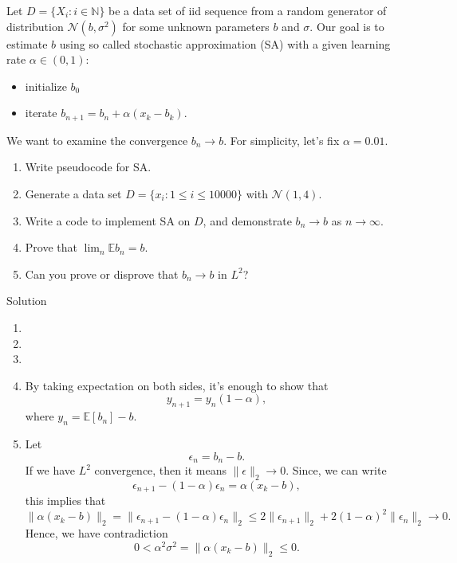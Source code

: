 \documentclass{article}
\begin{document}
Let $D = \{X_{i}: i\in \mathbb N\}$ be a data set of iid sequence from a random generator of distribution $\mathcal N(b, \sigma^{2})$ for some unknown parameters $b$ and $\sigma$.
Our goal is to estimate $b$ using so called stochastic approximation (SA)
with a given learning rate $\alpha \in (0,1)$:
\begin{itemize}
 \item initialize $b_{0}$
 \item iterate $b_{n+1} = b_{n} + \alpha (x_{k} - b_{k})$.
\end{itemize}
We want to examine the convergence $b_{n} \to b$.
For simplicity, let's fix $\alpha = 0.01$.
\begin{enumerate}
 \item Write pseudocode for SA.
 \item Generate a data set $D = \{x_{i}: 1\le i \le 10000\}$ with $\mathcal N (1, 4)$.
 \item Write a code to implement SA on $D$, and demonstrate $b_{n} \to b$ as $n\to \infty$.
 \item Prove that $ \lim_{n}\mathbb E b_{n} = b$.
 \item Can you prove or disprove that $b_{n} \to b$ in $L^{2}$? 
\end{enumerate}

Solution
\begin{enumerate}
 \item 
 \item 
 \item
 \item By taking expectation on both sides, it's enough to show that
 $$y_{n+1} = y_{n} (1 - \alpha),$$
 where $y_{n} = \mathbb E[b_{n}] - b$.
 \item Let 
 $$\epsilon_{n} = b_{n} - b.$$
 If we have $L^{2}$ convergence, then it means $\|\epsilon\|_{2} \to 0$.
Since, we can write
 $$\epsilon_{n+1}  - (1-\alpha) \epsilon_{n} = \alpha (x_{k} - b),$$
this implies that
 $$
 \|\alpha (x_{k} - b)\|_{2} =
 \|\epsilon_{n+1}  - (1-\alpha) \epsilon_{n}\|_{2}\le 2 \|\epsilon_{n+1}\|_{2} +
 2 (1-\alpha)^{2} \|\epsilon_{n} \|_{2} \to 0.
 $$
 Hence, we have contradiction
 $$ 0<\alpha^{2} \sigma^{2} = \|\alpha (x_{k} - b)\|_{2}\le 0.$$
 

\end{enumerate}
\end{document}
